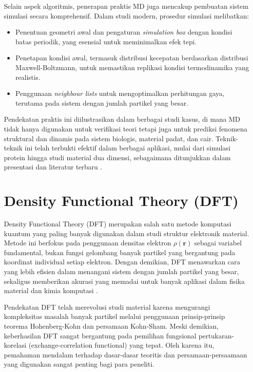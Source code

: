 Selain aspek algoritmis, penerapan praktis MD juga mencakup pembuatan sistem simulasi secara komprehensif. Dalam studi modern, prosedur simulasi melibatkan:
\begin{itemize}
    \item Penentuan geometri awal dan pengaturan \emph{simulation box} dengan kondisi batas periodik, yang esensial untuk meminimalkan efek tepi.
    \item Penetapan kondisi awal, termasuk distribusi kecepatan berdasarkan distribusi Maxwell-Boltzmann, untuk memastikan replikasi kondisi termodinamika yang realistis.
    \item Penggunaan \emph{neighbour lists} untuk mengoptimalkan perhitungan gaya, terutama pada sistem dengan jumlah partikel yang besar.
\end{itemize}

Pendekatan praktis ini diilustrasikan dalam berbagai studi kasus, di mana MD tidak hanya digunakan untuk verifikasi teori tetapi juga untuk prediksi fenomena struktural dan dinamis pada sistem biologis, material padat, dan cair. Teknik-teknik ini telah terbukti efektif dalam berbagai aplikasi, mulai dari simulasi protein hingga studi material dua dimensi, sebagaimana ditunjukkan dalam presentasi dan literatur terbaru \citep{xiao_md_2013}.

\section{Density Functional Theory (DFT)}
Density Functional Theory (DFT) merupakan salah satu metode komputasi kuantum yang paling banyak digunakan dalam studi struktur elektronik material. Metode ini berfokus pada penggunaan densitas elektron \(\rho(\mathbf{r})\) sebagai variabel fundamental, bukan fungsi gelombang banyak partikel yang bergantung pada koordinat individual setiap elektron. Dengan demikian, DFT menawarkan cara yang lebih efisien dalam menangani sistem dengan jumlah partikel yang besar, sekaligus memberikan akurasi yang memadai untuk banyak aplikasi dalam fisika material dan kimia komputasi \citep{kohn_self-consistent_1965, Martin2004}.

Pendekatan DFT telah merevolusi studi material karena mengurangi kompleksitas masalah banyak partikel melalui penggunaan prinsip-prinsip teorema Hohenberg-Kohn dan persamaan Kohn-Sham. Meski demikian, keberhasilan DFT sangat bergantung pada pemilihan fungsional pertukaran-korelasi (exchange-correlation functional) yang tepat. Oleh karena itu, pemahaman mendalam terhadap dasar-dasar teoritis dan persamaan-persaamaan yang digunakan sangat penting bagi para peneliti.

